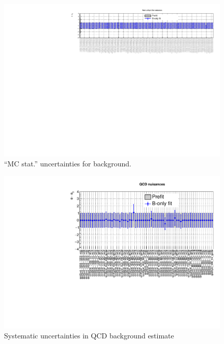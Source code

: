 \begin{figure}[h!]
  \centering
  \caption{``MC stat.'' uncertainties for \znunuj background.}
  \includegraphics[width=1.\linewidth]{figures/results/36invfb/postfit/nuis/FormulaSystZinv_nuisances}
\end{figure}

\clearpage
\begin{figure}[h!]
  \centering
  \caption{Systematic uncertainties in QCD background estimate}
  \includegraphics[width=1.\linewidth]{figures/results/36invfb/postfit/nuis/qcd_nuisances}
\end{figure}

